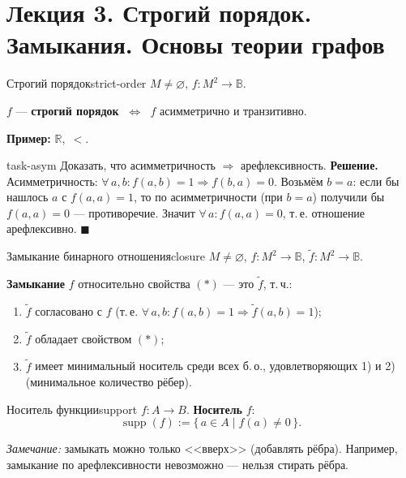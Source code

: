 \chapter{Лекция 3. Строгий порядок. Замыкания. Основы теории графов}


\begin{defn}{Строгий порядок}{strict-order}
$M \neq \varnothing$,\; $f\colon M^2 \to \mathbb{B}$.

$f$ --- \textbf{строгий порядок} $\;\Leftrightarrow\;$
$f$ асимметрично и транзитивно.
\end{defn}

\textbf{Пример:} $\mathbb{R},\; <$.

\begin{task}{}{task-asym}
Доказать, что асимметричность $\Rightarrow$ арефлексивность.
\tcblower
\textbf{Решение.} Асимметричность: $\forall\, a, b\colon
f(a,b) = 1 \Rightarrow f(b,a) = 0$. Возьмём $b = a$: если бы нашлось $a$
с $f(a,a) = 1$, то по асимметричности (при $b = a$) получили бы
$f(a,a) = 0$ --- противоречие. Значит $\forall\, a\colon f(a,a) = 0$,
т.\,е. отношение арефлексивно. $\blacksquare$
\end{task}

\bigskip
\begin{defn}{Замыкание бинарного отношения}{closure}
$M \neq \varnothing$,\; $f\colon M^2 \to \mathbb{B}$,\;
$\tilde{f}\colon M^2 \to \mathbb{B}$.

\textbf{Замыкание} $f$ относительно свойства $(*)$ --- это $\tilde{f}$, т.\,ч.:
\begin{enumerate}
  \item $\tilde{f}$ согласовано с $f$
        (т.\,е. $\forall\, a,b\colon f(a,b)=1 \Rightarrow \tilde{f}(a,b)=1$);
  \item $\tilde{f}$ обладает свойством $(*)$;
  \item $\tilde{f}$ имеет минимальный носитель среди всех б.\,о.,
        удовлетворяющих 1) и 2) (минимальное количество рёбер).
\end{enumerate}
\end{defn}

\begin{defn}{Носитель функции}{support}
$f\colon A \to B$. \textbf{Носитель} $f$:
\[
  \operatorname{supp}(f) := \bigl\{\, a \in A \;\big|\; f(a) \neq 0 \,\bigr\}.
\]
\end{defn}

\textit{Замечание:} замыкать можно только <<вверх>> (добавлять рёбра).
Например, замыкание по арефлексивности невозможно --- нельзя стирать рёбра.

